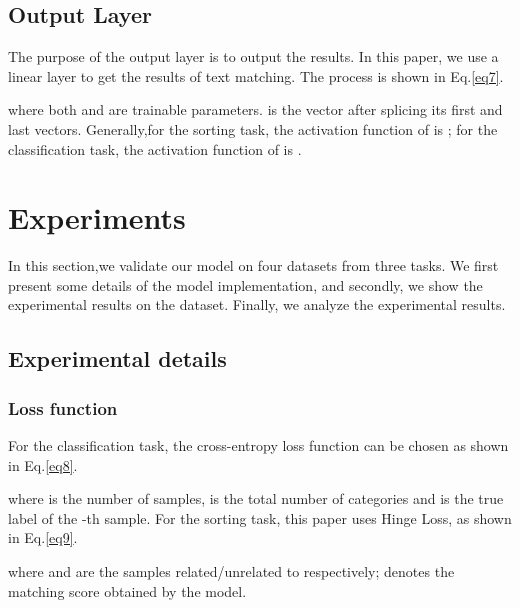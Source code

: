 \documentclass[review]{elsarticle}
\begin{document}
\subsection{Output Layer}

The purpose of the output layer is to output the results. In this paper, we use a linear layer to get the results of text matching. The process is shown  in Eq.\ref{eq7}.

where both  and  are trainable parameters.  is the vector after splicing its first and last vectors. Generally,for the sorting task, the activation function of  is ; for the classification task, the activation function of  is .
\section{Experiments}
In this section,we validate our model on four datasets from three tasks. We first present some details of the model implementation, and secondly, we show the experimental results on the dataset. Finally, we analyze the experimental results.
\subsection{Experimental details}
\subsubsection{Loss function}
For the classification task, the cross-entropy loss function can be chosen as shown  in Eq.\ref{eq8}.

where  is the number of samples,  is the total number of categories and  is the true label of the -th sample. For the sorting task, this paper uses Hinge Loss, as shown in Eq.\ref{eq9}.

where  and  are the samples related/unrelated to  respectively;  denotes the matching score obtained by the model.
\end{document}

